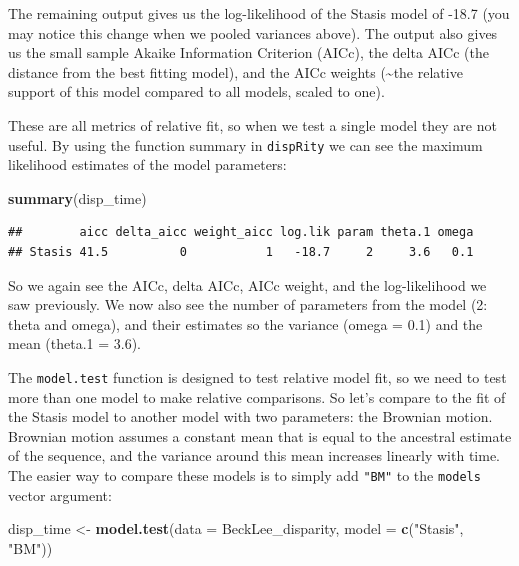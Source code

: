 \documentclass[]{book}
\newenvironment{Shaded}{\begin{snugshade}}{\end{snugshade}}
\newcommand{\DataTypeTok}[1]{\textcolor[rgb]{0.13,0.29,0.53}{#1}}
\newcommand{\KeywordTok}[1]{\textcolor[rgb]{0.13,0.29,0.53}{\textbf{#1}}}
\newcommand{\NormalTok}[1]{#1}
\newcommand{\StringTok}[1]{\textcolor[rgb]{0.31,0.60,0.02}{#1}}
\begin{document}
The remaining output gives us the log-likelihood of the Stasis model of -18.7 (you may notice this change when we pooled variances above).
The output also gives us the small sample Akaike Information Criterion (AICc), the delta AICc (the distance from the best fitting model), and the AICc weights (\textasciitilde{}the relative support of this model compared to all models, scaled to one).

These are all metrics of relative fit, so when we test a single model they are not useful.
By using the function summary in \texttt{dispRity} we can see the maximum likelihood estimates of the model parameters:

\begin{Shaded}
\begin{Highlighting}[]
\KeywordTok{summary}\NormalTok{(disp_time)}
\end{Highlighting}
\end{Shaded}

\begin{verbatim}
##        aicc delta_aicc weight_aicc log.lik param theta.1 omega
## Stasis 41.5          0           1   -18.7     2     3.6   0.1
\end{verbatim}

So we again see the AICc, delta AICc, AICc weight, and the log-likelihood we saw previously.
We now also see the number of parameters from the model (2: theta and omega), and their estimates so the variance (omega = 0.1) and the mean (theta.1 = 3.6).

The \texttt{model.test} function is designed to test relative model fit, so we need to test more than one model to make relative comparisons.
So let's compare to the fit of the Stasis model to another model with two parameters: the Brownian motion.
Brownian motion assumes a constant mean that is equal to the ancestral estimate of the sequence, and the variance around this mean increases linearly with time.
The easier way to compare these models is to simply add \texttt{"BM"} to the \texttt{models} vector argument:

\begin{Shaded}
\begin{Highlighting}[]
\NormalTok{disp_time <-}\StringTok{ }\KeywordTok{model.test}\NormalTok{(}\DataTypeTok{data =}\NormalTok{ BeckLee_disparity,}
                        \DataTypeTok{model =} \KeywordTok{c}\NormalTok{(}\StringTok{"Stasis"}\NormalTok{, }\StringTok{"BM"}\NormalTok{))}
\end{Highlighting}
\end{Shaded}
\end{document}
